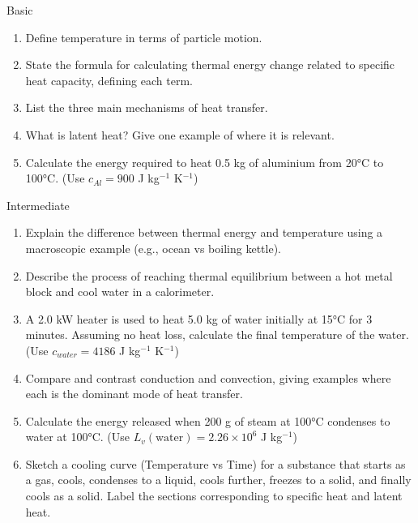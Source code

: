 \begin{tieredquestions}{Basic}
\begin{enumerate}
    \item Define temperature in terms of particle motion.
    \item State the formula for calculating thermal energy change related to specific heat capacity, defining each term.
    \item List the three main mechanisms of heat transfer.
    \item What is latent heat? Give one example of where it is relevant.
    \item Calculate the energy required to heat 0.5 kg of aluminium from 20°C to 100°C. (Use \(c_{Al} = 900\) J kg\(^{-1}\) K\(^{-1}\))
\end{enumerate}
\end{tieredquestions}

\begin{tieredquestions}{Intermediate}
\begin{enumerate}
    \item Explain the difference between thermal energy and temperature using a macroscopic example (e.g., ocean vs boiling kettle).
    \item Describe the process of reaching thermal equilibrium between a hot metal block and cool water in a calorimeter.
    \item A 2.0 kW heater is used to heat 5.0 kg of water initially at 15°C for 3 minutes. Assuming no heat loss, calculate the final temperature of the water. (Use \(c_{water} = 4186\) J kg\(^{-1}\) K\(^{-1}\))
    \item Compare and contrast conduction and convection, giving examples where each is the dominant mode of heat transfer.
    \item Calculate the energy released when 200 g of steam at 100°C condenses to water at 100°C. (Use \(L_v(\text{water}) = 2.26 \times 10^6\) J kg\(^{-1}\))
    \item Sketch a cooling curve (Temperature vs Time) for a substance that starts as a gas, cools, condenses to a liquid, cools further, freezes to a solid, and finally cools as a solid. Label the sections corresponding to specific heat and latent heat.
\end{enumerate}
\end{tieredquestions}

